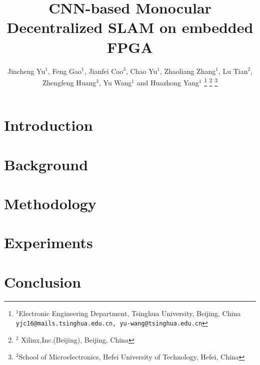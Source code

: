 \documentclass[letterpaper, 10 pt, conference]{ieeeconf}  %
\title{\LARGE \bf
CNN-based Monocular Decentralized SLAM on embedded FPGA
}
\author{Jincheng Yu$^{1}$, Feng Gao$^{1}$, Jianfei Cao$^{3}$, Chao Yu$^{1}$, Zhaoliang Zhang$^{1}$, Lu Tian$^{2}$, \\ Zhengfeng Huang$^{3}$, Yu Wang$^{1}$ and Huazhong Yang$^{1}$ %
\thanks{$^{1}$Electronic Engineering Department,
        Tsinghua University, Beijing, China
        {\tt\small yjc16@mails.tsinghua.edu.cn, yu-wang@tsinghua.edu.cn}}%
\thanks{$^{2}$ Xilinx,Inc.(Beijing), Beijing, China}%
\thanks{$^{3}$School of Microelectronics,
Hefei University of Technology,
Hefei, China}%
}
\begin{document}
\maketitle
\thispagestyle{empty}
\pagestyle{empty}


\begin{abstract}

\end{abstract}

\section{Introduction}


\section{Background}



\section{Methodology}



\section{Experiments}


\section{Conclusion}



% 




\end{document}
